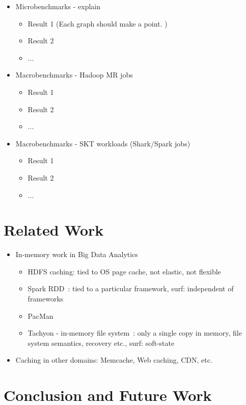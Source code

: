 \documentclass[twocolumn,10pt]{article}
\begin{document}
\begin{itemize}
\item Microbenchmarks - explain
\begin{itemize}
\item Result 1 (Each graph should make a point. )
\item Result 2 
\item ...
\end{itemize}

\item Macrobenchmarks - Hadoop MR jobs
\begin{itemize}
\item Result 1
\item Result 2
\item ...
\end{itemize}

\item Macrobenchmarks - SKT workloads (Shark/Spark jobs)  
\begin{itemize}
\item Result 1
\item Result 2
\item ...
\end{itemize}

\end{itemize}

\section{Related Work}

\begin{itemize}
\item In-memory work in Big Data Analytics
\begin{itemize}
\item HDFS caching: tied to OS page cache, not elastic, not flexible
\item Spark RDD~\cite{sparknsdi}: tied to a particular framework, surf: independent of frameworks
\item PacMan~\cite{pacman}
\item Tachyon - in-memory file system~\cite{tachyon}: only a single copy in memory, file system semantics, recovery etc., surf: soft-state
\end{itemize}
\item Caching in other domains: Memcache, Web caching, CDN, etc.
\end{itemize}

\section{Conclusion and Future Work}
\end{document}
